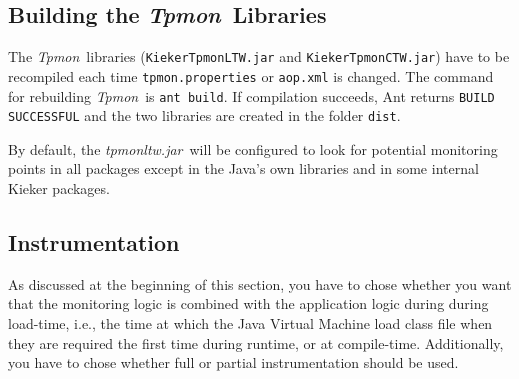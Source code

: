 \documentclass[a4paper,12pt]{scrartcl}
\newcommand{\tpmon}{\textit{Tpmon}}
\newcommand{\tpmonltw}{\textit{tpmonltw.jar}}
\begin{document}
\subsection{Building the \tpmon\ Libraries}
The \tpmon\ libraries (\texttt{KiekerTpmonLTW.jar} and \texttt{KiekerTpmonCTW.jar}) have to be recompiled each time \texttt{tpmon.properties} or \texttt{aop.xml} is changed. The command for rebuilding \tpmon\ is \texttt{ant build}. If compilation succeeds, Ant returns \texttt{BUILD SUCCESSFUL} and the two libraries are created in the folder \texttt{dist}.

By default, the \tpmonltw\ will be configured to look for potential monitoring points in all packages except in the Java's own libraries and in some internal Kieker packages. %

% 
% 

\subsection{Instrumentation}
As discussed at the beginning of this section, you have to chose
 whether you want that the monitoring logic is combined with the application
 logic during during load-time, i.e., the time at which the Java Virtual Machine
 load class file when they are required the first time during runtime, or at compile-time. Additionally,
you have to chose whether full or partial instrumentation should be used.
\end{document}
